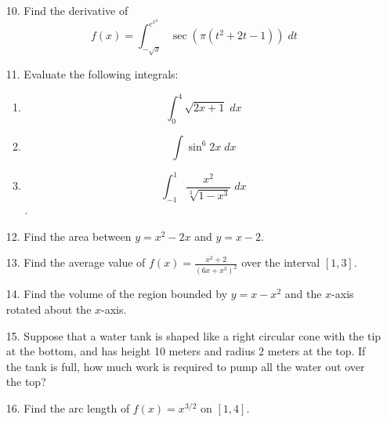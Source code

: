 \documentclass[11pt,reqno]{article}
\theoremstyle{definition}
\begin{document}
\begin{enumerate}
		\item[10.] Find the derivative of $$f(x) = \int_{-\sqrt{x}}^{e^{x^2 }} \sec(\pi(t^2 + 2t - 1)) \; dt$$
		\item[11.] Evaluate the following integrals: 
		\begin{enumerate}
			\item $$\int_{0}^{4} \sqrt{2x + 1} \; dx$$
			\item $$\int \sin^6 2x \; dx$$ 
			\item $$\int_{-1}^{1} \frac{x^2}{\sqrt[3]{1 - x^3}} \; dx$$. 
		\end{enumerate}
		\item[12.] Find the area between $y = x^2 - 2x$ and $y = x - 2$. 
		\item[13.] Find the average value of $f(x) = \frac{x^2 + 2}{(6x + x^3)^2}$ over the interval $[1, 3]$. 
		\item[14.] Find the volume of the region bounded by $y = x - x^2$ and the $x$-axis rotated about the $x$-axis.
		\item[15.] Suppose that a water tank is shaped like a right circular cone with the tip at the bottom, and has height 10 meters and radius 2 meters at the top. If the tank is full, how much work is required to pump all the water out over the top? 
		\item[16.] Find the arc length of $f(x) = x^{3/2}$ on $[1,4]$. 
	\end{enumerate}
	

	
	
\end{document}
